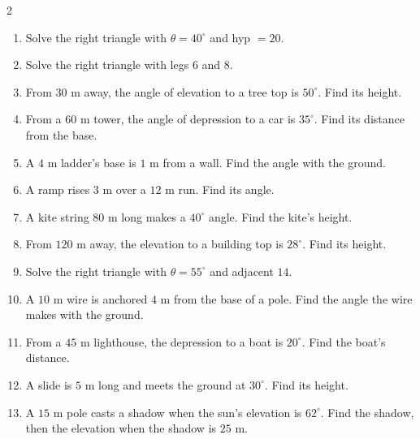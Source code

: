 \documentclass[11pt]{article}
\begin{document}
\clearpage
{}

\begin{recapbox}
\begin{multicols}{2}
\small
\begin{enumerate}[leftmargin=*,itemsep=3pt]
  \item Solve the right triangle with $\theta=40^\circ$ and hyp $=20$.
  \item Solve the right triangle with legs $6$ and $8$.
  \item From $30$ m away, the angle of elevation to a tree top is $50^\circ$. Find its height.
  \item From a $60$ m tower, the angle of depression to a car is $35^\circ$. Find its distance from the base.
  \item A $4$ m ladder's base is $1$ m from a wall. Find the angle with the ground.
  \item A ramp rises $3$ m over a $12$ m run. Find its angle.
  \item A kite string $80$ m long makes a $40^\circ$ angle. Find the kite's height.
  \item From $120$ m away, the elevation to a building top is $28^\circ$. Find its height.
  \item Solve the right triangle with $\theta=55^\circ$ and adjacent $14$.
  \item A $10$ m wire is anchored $4$ m from the base of a pole. Find the angle the wire makes with the ground.
  \item From a $45$ m lighthouse, the depression to a boat is $20^\circ$. Find the boat's distance.
  \item A slide is $5$ m long and meets the ground at $30^\circ$. Find its height.
  \item A $15$ m pole casts a shadow when the sun's elevation is $62^\circ$. Find the shadow, then the elevation when the shadow is $25$ m.
\end{enumerate}
\end{multicols}
\end{recapbox}
\end{document}
